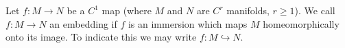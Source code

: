 Let $f: M \to N$ be a $C^1$ map (where $M$ and $N$ are $C^r$ manifolds, $r \geqslant 1$). We call $f: M \to N$ an embedding if $f$ is an immersion which maps $M$ homeomorphically onto its image. To indicate this we may write $f: M \hookrightarrow N$.
